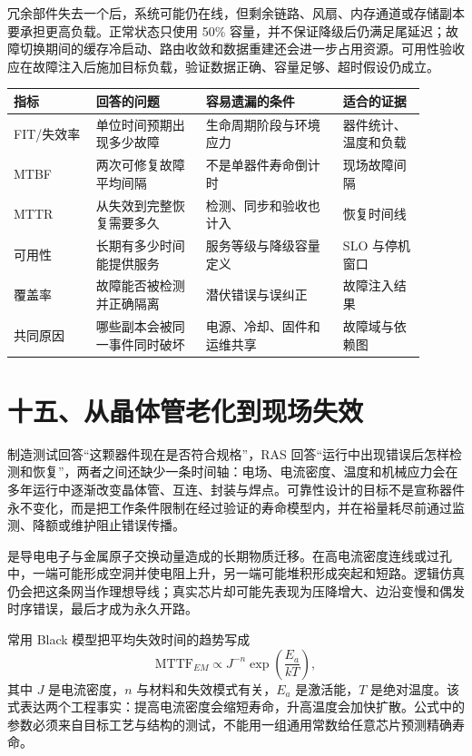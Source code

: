 
冗余部件失去一个后，系统可能仍在线，但剩余链路、风扇、内存通道或存储副本要承担更高负载。正常状态只使用 50\% 容量，并不保证降级后仍满足尾延迟；故障切换期间的缓存冷启动、路由收敛和数据重建还会进一步占用资源。可用性验收应在故障注入后施加目标负载，验证数据正确、容量足够、超时假设仍成立。

\begin{longtable}{L{0.18\linewidth}L{0.24\linewidth}L{0.30\linewidth}L{0.18\linewidth}}
\toprule
指标 & 回答的问题 & 容易遗漏的条件 & 适合的证据 \\
\midrule
FIT/失效率 & 单位时间预期出现多少故障 & 生命周期阶段与环境应力 & 器件统计、温度和负载 \\\tablerowrule
MTBF & 两次可修复故障平均间隔 & 不是单器件寿命倒计时 & 现场故障间隔 \\\tablerowrule
MTTR & 从失效到完整恢复需要多久 & 检测、同步和验收也计入 & 恢复时间线 \\\tablerowrule
可用性 & 长期有多少时间能提供服务 & 服务等级与降级容量定义 & SLO 与停机窗口 \\\tablerowrule
覆盖率 & 故障能否被检测并正确隔离 & 潜伏错误与误纠正 & 故障注入结果 \\\tablerowrule
共同原因 & 哪些副本会被同一事件同时破坏 & 电源、冷却、固件和运维共享 & 故障域与依赖图 \\
\bottomrule
\end{longtable}
\section{十五、从晶体管老化到现场失效}

制造测试回答“这颗器件现在是否符合规格”，RAS 回答“运行中出现错误后怎样检测和恢复”，两者之间还缺少一条时间轴：电场、电流密度、温度和机械应力会在多年运行中逐渐改变晶体管、互连、封装与焊点。可靠性设计的目标不是宣称器件永不变化，而是把工作条件限制在经过验证的寿命模型内，并在裕量耗尽前通过监测、降额或维护阻止错误传播。\cite{nasa-pof-reliability}


是导电电子与金属原子交换动量造成的长期物质迁移。在高电流密度连线或过孔中，一端可能形成空洞并使电阻上升，另一端可能堆积形成突起和短路。逻辑仿真仍会把这条网当作理想导线；真实芯片却可能先表现为压降增大、边沿变慢和偶发时序错误，最后才成为永久开路。

常用 Black 模型把平均失效时间的趋势写成
\[
  \mathrm{MTTF}_{EM} \propto J^{-n}
  \exp\left(\frac{E_a}{kT}\right),
\]
其中 $J$ 是电流密度，$n$ 与材料和失效模式有关，$E_a$ 是激活能，$T$ 是绝对温度。该式表达两个工程事实：提高电流密度会缩短寿命，升高温度会加快扩散。公式中的参数必须来自目标工艺与结构的测试，不能用一组通用常数给任意芯片预测精确寿命。

